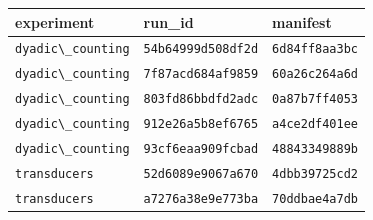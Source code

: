 \begin{tabular}{lll}%
\hline%
\textbf{experiment}&\textbf{run\_id}&\textbf{manifest}\\%
\hline%
\texttt{dyadic\textbackslash{}\_counting}&\texttt{54b64999d508df2d}&\texttt{6d84ff8aa3bc}\\%
\texttt{dyadic\textbackslash{}\_counting}&\texttt{7f87acd684af9859}&\texttt{60a26c264a6d}\\%
\texttt{dyadic\textbackslash{}\_counting}&\texttt{803fd86bbdfd2adc}&\texttt{0a87b7ff4053}\\%
\texttt{dyadic\textbackslash{}\_counting}&\texttt{912e26a5b8ef6765}&\texttt{a4ce2df401ee}\\%
\texttt{dyadic\textbackslash{}\_counting}&\texttt{93cf6eaa909fcbad}&\texttt{48843349889b}\\%
\texttt{transducers}&\texttt{52d6089e9067a670}&\texttt{4dbb39725cd2}\\%
\texttt{transducers}&\texttt{a7276a38e9e773ba}&\texttt{70ddbae4a7db}\\%
\hline%
\end{tabular}
